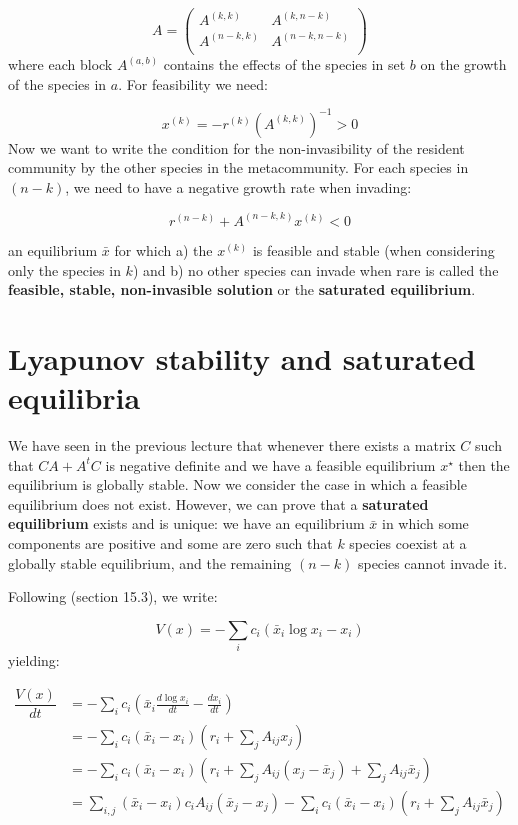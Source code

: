 \documentclass[]{book}
\begin{document}
\[
A = \begin{pmatrix}
A^{(k,k)} & A^{(k, n- k)}\\
A^{(n-k,k)} & A^{(n-k, n- k)}\\
  \end{pmatrix}
\]
where each block \(A^{(a,b)}\) contains the effects of the species in set \(b\) on the growth of the species in \(a\). For feasibility we need:

\[
x^{(k)} = -r^{(k)}\left(A^{(k,k)} \right)^{-1} > 0
\]
Now we want to write the condition for the non-invasibility of the resident community by the other species in the metacommunity. For each species in \((n-k)\), we need to have a negative growth rate when invading:

\[
r^{(n-k)} + A^{(n-k,k)}x^{(k)} < 0
\]

an equilibrium \(\bar{x}\) for which a) the \(x^{(k)}\) is feasible and stable (when considering only the species in \(k\)) and b) no other species can invade when rare is called the \textbf{feasible, stable, non-invasible solution} or the \textbf{saturated equilibrium}.

\hypertarget{lyapunov-stability-and-saturated-equilibria}{%
\section{Lyapunov stability and saturated equilibria}\label{lyapunov-stability-and-saturated-equilibria}}

We have seen in the previous lecture that whenever there exists a matrix \(C\) such that \(CA + A^t C\) is negative definite and we have a feasible equilibrium \(x^\star\) then the equilibrium is globally stable. Now we consider the case in which a feasible equilibrium does not exist. However, we can prove that a \textbf{saturated equilibrium} exists and is unique: we have an equilibrium \(\bar{x}\) in which some components are positive and some are zero such that \(k\) species coexist at a globally stable equilibrium, and the remaining \((n-k)\) species cannot invade it.

Following \citet{hofbauer1998evolutionary} (section 15.3), we write:

\[
V(x) = -\sum_i c_i (\bar{x}_i \log x_i - x_i)
\]
yielding:

\[
\begin{aligned}
\dfrac{V(x)}{dt} &= -\sum_i c_i \left(\bar{x}_i \frac{d \log x_i}{dt} - \frac{d x_i}{dt} \right) \\
&= -\sum_i c_i \left( \bar{x}_i - x_i \right)  \left( r_i + \sum_j A_{ij} x_j \right) \\
&= -\sum_i c_i \left( \bar{x}_i - x_i \right)  \left( r_i + \sum_j A_{ij} (x_j - \bar{x}_j) +  \sum_j A_{ij} \bar{x}_j \right) \\
&= \sum_{i,j} \left( \bar{x}_i - x_i \right) c_i A_{ij} \left( \bar{x}_j - x_j \right) - \sum_i c_i \left( \bar{x}_i - x_i \right) \left(r_i + \sum_j A_{ij} \bar{x}_j \right)
\end{aligned}
\]
\end{document}
